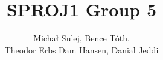 \documentclass{article}
\title{SPROJ1 Group 5}
\author{Michał Sulej, Bence Tóth, \\Theodor Erbs Dam Hansen, Danial Jeddi}
\date{\parbox{\linewidth}{\centering%
  January $2^{\text{nd}}$ 2024\endgraf\bigskip
  Assoc. Prof. Luciana Tavares \hspace*{1cm} Assoc. Prof. Oliver Niebuhr\endgraf\vspace{3mm}
  Mentor\ Mikkel B. Mogensen \endgraf\vspace{6mm}
  University of Southern Denmark}}
\begin{document}
\maketitle

\label{sec:tableofcontents}
\tableofcontents

\newpage










\end{document}
